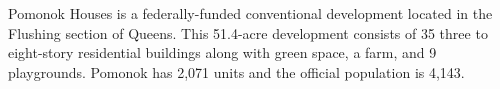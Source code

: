  

Pomonok Houses is a federally-funded conventional development located in the Flushing section of Queens. This 51.4-acre development consists of 35 three to eight-story residential buildings along with green space, a farm, and 9 playgrounds. Pomonok has 2,071 units and the official population is 4,143. 